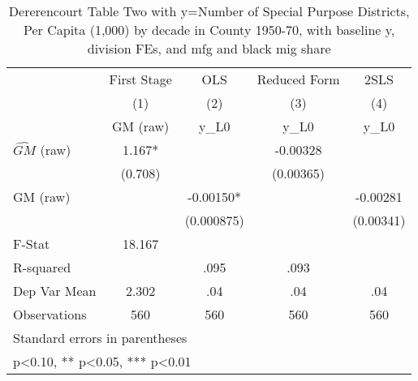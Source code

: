 \begin{table}[htbp]\centering
\def\sym#1{\ifmmode^{#1}\else\(^{#1}\)\fi}
\caption{Dererencourt Table Two with y=Number of Special Purpose Districts, Per Capita (1,000) by decade in County 1950-70, with baseline y, division FEs, and mfg and black mig share}
\begin{tabular}{l*{4}{c}}
\toprule
                    & First Stage   &         OLS   &Reduced Form   &        2SLS   \\
                    &\multicolumn{1}{c}{(1)}&\multicolumn{1}{c}{(2)}&\multicolumn{1}{c}{(3)}&\multicolumn{1}{c}{(4)}\\
                    &\multicolumn{1}{c}{GM  (raw)}&\multicolumn{1}{c}{y\_L0}&\multicolumn{1}{c}{y\_L0}&\multicolumn{1}{c}{y\_L0}\\
\midrule
$\hat{GM}$ (raw)    &       1.167*  &               &    -0.00328   &               \\
                    &     (0.708)   &               &   (0.00365)   &               \\
\addlinespace
GM  (raw)           &               &    -0.00150*  &               &    -0.00281   \\
                    &               &  (0.000875)   &               &   (0.00341)   \\
\midrule
F-Stat              &      18.167   &               &               &               \\
R-squared           &               &        .095   &        .093   &               \\
Dep Var Mean        &       2.302   &         .04   &         .04   &         .04   \\
Observations        &         560   &         560   &         560   &         560   \\
\bottomrule
\multicolumn{5}{l}{\footnotesize Standard errors in parentheses}\\
\multicolumn{5}{l}{\footnotesize * p<0.10, ** p<0.05, *** p<0.01}\\
\end{tabular}
\end{table}
